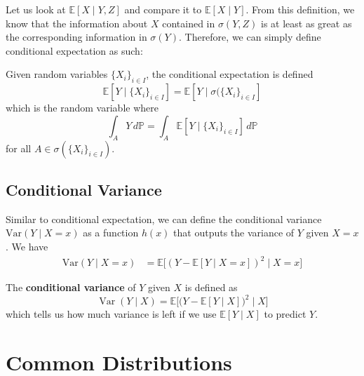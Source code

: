 \documentclass{article}
\DeclareMathOperator{\Var}{Var}
\begin{document}
    Let us look at $\mathbb{E}[X \mid Y, Z]$ and compare it to $\mathbb{E}[X \mid Y]$. From this definition, we know that the information about $X$ contained in $\sigma(Y, Z)$ is at least as great as the corresponding information in $\sigma(Y)$. Therefore, we can simply define conditional expectation as such: 

    \begin{definition}
      Given random variables $\{X_i\}_{i \in I}$, the conditional expectation is defined 
      \begin{equation}
        \mathbb{E}[Y \mid \{X_i\}_{i \in I} ] = \mathbb{E}[ Y \mid \sigma(\{X_i \}_{i \in I}]
      \end{equation}
      which is the random variable where 
      \begin{equation}
        \int_A Y \, d\mathbb{P} = \int_A \mathbb{E}[Y \mid \{X_i\}_{i \in I} ] \, d\mathbb{P}
      \end{equation}
      for all $A \in \sigma(\{X_i \}_{i \in I})$. 
    \end{definition}

  \subsection{Conditional Variance}

    Similar to conditional expectation, we can define the conditional variance $\mathrm{Var}(Y \mid X = x)$ as a function $h(x)$ that outputs the variance of $Y$ given $X = x$. We have
    \begin{align}
      \mathrm{Var}(Y \mid X = x) & = \mathbb{E}\big[ ( Y - \mathbb{E}[Y \mid X = x] )^2 \mid X = x \big]
    \end{align}

    \begin{definition}
      The \textbf{conditional variance} of $Y$ given $X$ is defined as 
      \begin{equation}
        \Var(Y \mid X) = \mathbb{E} \big[ \big( Y - \mathbb{E}[Y \mid X] \big)^2 \mid X \big]
      \end{equation}
      which tells us how much variance is left if we use $\mathbb{E}[Y \mid X]$ to predict $Y$. 
    \end{definition}

\section{Common Distributions}
\end{document}
